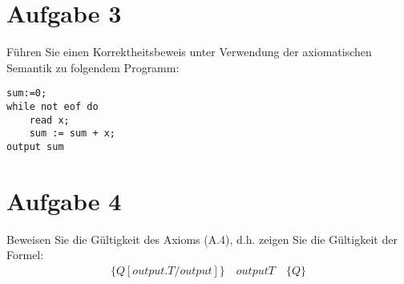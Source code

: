\documentclass[ngerman,a4paper]{report}
\begin{document}
\section*{Aufgabe 3}
Führen Sie einen Korrektheitsbeweis unter Verwendung der axiomatischen Semantik zu folgendem Programm:\\
\begin{lstlisting}
sum:=0;
while not eof do
	read x;
	sum := sum + x;
output sum
\end{lstlisting}
\section*{Aufgabe 4}
Beweisen Sie die Gültigkeit des Axioms (A.4), d.h. zeigen Sie die Gültigkeit der Formel:
\begin{align*}
\{Q[output.T/output]\}\quad
output T\quad
\{Q\}
\end{align*}
\end{document}
